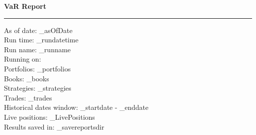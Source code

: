 \documentclass[letterpaper,10pt,landscape]{article}
\begin{document}
\begin{flushright}
{\color{blue}\LARGE\bf{VaR Report}}
\end{flushright}
\rule{\textwidth}{1pt}

\noindent
As of date: _asOfDate \\
Run time: _rundatetime \\
Run name: _runname \\
Running on:\\
\hspace*{\parindent}Portfolios: _portfolios \\
\hspace*{\parindent}Books: _books \\
\hspace*{\parindent}Strategies: _strategies \\
\hspace*{\parindent}Trades: _trades \\
Historical dates window: _startdate - _enddate \\
Live positions: _LivePositions \\
Results saved in: _savereportsdir \\

\begin{center}\end{center}

  

  
%

\end{document}

